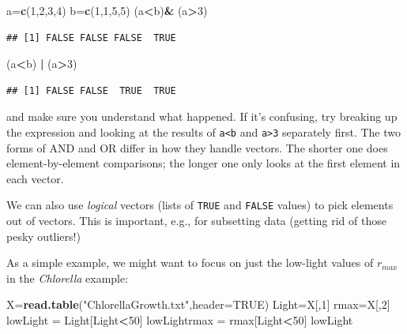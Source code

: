 \documentclass[11pt,]{article}
\newenvironment{Shaded}{\begin{snugshade}}{\end{snugshade}}
\newcommand{\DataTypeTok}[1]{\textcolor[rgb]{0.13,0.29,0.53}{#1}}
\newcommand{\DecValTok}[1]{\textcolor[rgb]{0.00,0.00,0.81}{#1}}
\newcommand{\KeywordTok}[1]{\textcolor[rgb]{0.13,0.29,0.53}{\textbf{#1}}}
\newcommand{\NormalTok}[1]{#1}
\newcommand{\OperatorTok}[1]{\textcolor[rgb]{0.81,0.36,0.00}{\textbf{#1}}}
\newcommand{\OtherTok}[1]{\textcolor[rgb]{0.56,0.35,0.01}{#1}}
\newcommand{\StringTok}[1]{\textcolor[rgb]{0.31,0.60,0.02}{#1}}
\begin{document}
\begin{Shaded}
\begin{Highlighting}[]
\NormalTok{a=}\KeywordTok{c}\NormalTok{(}\DecValTok{1}\NormalTok{,}\DecValTok{2}\NormalTok{,}\DecValTok{3}\NormalTok{,}\DecValTok{4}\NormalTok{)}
\NormalTok{b=}\KeywordTok{c}\NormalTok{(}\DecValTok{1}\NormalTok{,}\DecValTok{1}\NormalTok{,}\DecValTok{5}\NormalTok{,}\DecValTok{5}\NormalTok{)}
\NormalTok{(a}\OperatorTok{<}\NormalTok{b)}\OperatorTok{&}\StringTok{ }\NormalTok{(a}\OperatorTok{>}\DecValTok{3}\NormalTok{)}
\end{Highlighting}
\end{Shaded}

\begin{verbatim}
## [1] FALSE FALSE FALSE  TRUE
\end{verbatim}

\begin{Shaded}
\begin{Highlighting}[]
\NormalTok{(a}\OperatorTok{<}\NormalTok{b) }\OperatorTok{|}\StringTok{ }\NormalTok{(a}\OperatorTok{>}\DecValTok{3}\NormalTok{)}
\end{Highlighting}
\end{Shaded}

\begin{verbatim}
## [1] FALSE FALSE  TRUE  TRUE
\end{verbatim}

and make sure you understand what happened. If it's confusing, try breaking up the expression
and looking at the results of \texttt{a\textless{}b} and \texttt{a\textgreater{}3} separately first. The two forms of AND and OR differ in how they handle vectors. The shorter one does element-by-element comparisons; the longer one only looks at the
first element in each vector.

We can also use \emph{logical} vectors (lists of \texttt{TRUE} and \texttt{FALSE} values) to pick elements out of vectors.
This is important, e.g., for subsetting data (getting rid of those pesky outliers!)

As a simple example, we might want to focus on just the low-light values of \(r_{max}\) in the \emph{Chlorella} example:

\begin{Shaded}
\begin{Highlighting}[]
\NormalTok{X=}\KeywordTok{read.table}\NormalTok{(}\StringTok{"ChlorellaGrowth.txt"}\NormalTok{,}\DataTypeTok{header=}\OtherTok{TRUE}\NormalTok{)}
\NormalTok{Light=X[,}\DecValTok{1}\NormalTok{]}
\NormalTok{rmax=X[,}\DecValTok{2}\NormalTok{]}
\NormalTok{lowLight =}\StringTok{ }\NormalTok{Light[Light}\OperatorTok{<}\DecValTok{50}\NormalTok{]}
\NormalTok{lowLightrmax =}\StringTok{ }\NormalTok{rmax[Light}\OperatorTok{<}\DecValTok{50}\NormalTok{]}
\NormalTok{lowLight}
\end{Highlighting}
\end{Shaded}
\end{document}
